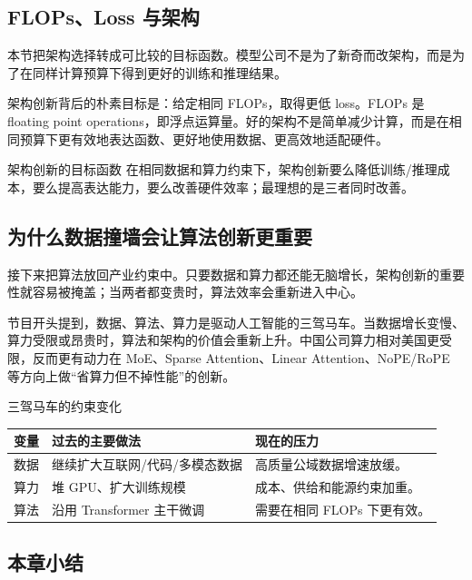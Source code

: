 \documentclass[a4paper]{article}
\begin{document}
\subsection{FLOPs、Loss 与架构}

本节把架构选择转成可比较的目标函数。模型公司不是为了新奇而改架构，而是为了在同样计算预算下得到更好的训练和推理结果。

架构创新背后的朴素目标是：给定相同 FLOPs，取得更低 loss。FLOPs 是 floating point operations，即浮点运算量。好的架构不是简单减少计算，而是在相同预算下更有效地表达函数、更好地使用数据、更高效地适配硬件。

\begin{importantbox}{架构创新的目标函数}
在相同数据和算力约束下，架构创新要么降低训练/推理成本，要么提高表达能力，要么改善硬件效率；最理想的是三者同时改善。
\end{importantbox}

\subsection{为什么数据撞墙会让算法创新更重要}

接下来把算法放回产业约束中。只要数据和算力都还能无脑增长，架构创新的重要性就容易被掩盖；当两者都变贵时，算法效率会重新进入中心。

节目开头提到，数据、算法、算力是驱动人工智能的三驾马车。当数据增长变慢、算力受限或昂贵时，算法和架构的价值会重新上升。中国公司算力相对美国更受限，反而更有动力在 MoE、Sparse Attention、Linear Attention、NoPE/RoPE 等方向上做“省算力但不掉性能”的创新。

\begin{knowledgebox}{三驾马车的约束变化}
\begin{tabularx}{\textwidth}{p{}p{}X}
\toprule
变量 & 过去的主要做法 & 现在的压力 \\
\midrule
数据 & 继续扩大互联网/代码/多模态数据 & 高质量公域数据增速放缓。 \\
算力 & 堆 GPU、扩大训练规模 & 成本、供给和能源约束加重。 \\
算法 & 沿用 Transformer 主干微调 & 需要在相同 FLOPs 下更有效。 \\
\bottomrule
\end{tabularx}
\end{knowledgebox}

\subsection{本章小结}
\end{document}
